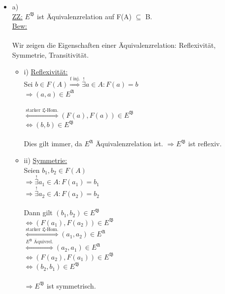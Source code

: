 \documentclass[a4paper]{scrartcl}
\begin{document}
\begin{itemize}
    \item a)\\
        \underline{ZZ:} $E^\mathfrak{B}$ ist Äquivalenzrelation auf F(A) $\subseteq$ B.\\
        \underline{Bew:}\\
        \\Wir zeigen die Eigenschaften einer Äquivalenzrelation: Reflexivität, Symmetrie, Transitivität.
        \begin{itemize}
            \item i) \underline{Reflexivität:}\\
                Sei $b \in F(A) \overset{\text{f inj.}}{\Rightarrow} \overset{!}{\exists} a \in A: F(a) = b$\\
                $\Rightarrow (a,a)\in E^\mathfrak{A}$\\
                \\$\overset{\text{starker }\mathfrak{L}\text{-Hom.}}{\Leftrightarrow} (F(a),F(a)) \in E^\mathfrak{B}$\\
                $\Leftrightarrow (b,b)\in E^\mathfrak{B}$\\
                \\Dies gilt immer, da $E^\mathfrak{A}$ Äquivalenzrelation ist. $\Rightarrow E^\mathfrak{B}$ ist reflexiv.\\
            \item ii) \underline{Symmetrie:}\\
                Seien $b_1, b_2 \in F(A)$\\
                $\Rightarrow \overset{!}{\exists} a_1 \in A: F(a_1) = b_1$\\
                $\Rightarrow \overset{!}{\exists} a_2 \in A: F(a_2) = b_2$\\
                \\Dann gilt $(b_1,b_2) \in E^\mathfrak{B}$\\
                $\Leftrightarrow (F(a_1),F(a_2)) \in E^\mathfrak{B}$\\
                $\overset{\text{starker }\mathfrak{L}\text{-Hom.}}{\Leftrightarrow} (a_1,a_2) \in E^\mathfrak{A}$\\
                $\overset{E^\mathfrak{A} \text{ Äquivrel.}}{\Leftrightarrow} (a_2,a_1) \in E^\mathfrak{A}$\\
                $\Leftrightarrow (F(a_2),F(a_1)) \in E^\mathfrak{B}$\\
                $\Leftrightarrow (b_2,b_1) \in E^\mathfrak{B}$\\
                \\$\Rightarrow E^\mathfrak{B}$ ist symmetrisch.\\


\end{itemize}
\end{itemize}
\end{document}
